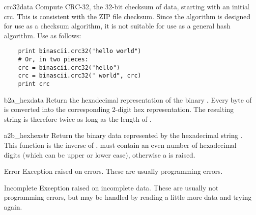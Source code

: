 \begin{funcdesc}{crc32}{data}
Compute CRC-32, the 32-bit checksum of data, starting with an initial
crc.  This is consistent with the ZIP file checksum.  Since the
algorithm is designed for use as a checksum algorithm, it is not
suitable for use as a general hash algorithm.  Use as follows:
\begin{verbatim}
    print binascii.crc32("hello world")
    # Or, in two pieces:
    crc = binascii.crc32("hello")
    crc = binascii.crc32(" world", crc)
    print crc
\end{verbatim}
\end{funcdesc}
 
\begin{funcdesc}{b2a_hex}{data}
Return the hexadecimal representation of the binary .  Every
byte of  is converted into the corresponding 2-digit hex
representation.  The resulting string is therefore twice as long as
the length of .
\end{funcdesc}

\begin{funcdesc}{a2b_hex}{hexstr}
Return the binary data represented by the hexadecimal string
.  This function is the inverse of .
 must contain an even number of hexadecimal digits (which
can be upper or lower case), otherwise a  is
raised.
\end{funcdesc}

\begin{excdesc}{Error}
Exception raised on errors. These are usually programming errors.
\end{excdesc}

\begin{excdesc}{Incomplete}
Exception raised on incomplete data. These are usually not programming
errors, but may be handled by reading a little more data and trying
again.
\end{excdesc}


\begin{seealso}



\end{seealso}
